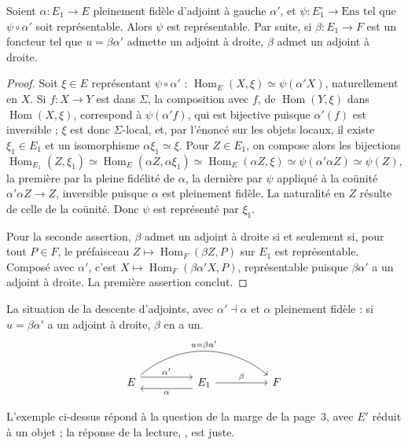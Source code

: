 \begin{enonce}
Soient $\alpha : E_1 \to E$ pleinement fidèle d'adjoint à gauche $\alpha'$, et $\psi : E_1^{\circ} \to \mathrm{Ens}$ tel que $\psi \circ \alpha'$ soit représentable. Alors $\psi$ est représentable. Par suite, si $\beta : E_1 \to F$ est un foncteur tel que $u = \beta\alpha'$ admette un adjoint à droite, $\beta$ admet un adjoint à droite.
\end{enonce}

\begin{proof}
Soit $\xi \in E$ représentant $\psi \circ \alpha'$ : $\operatorname{Hom}_E(X, \xi) \simeq \psi(\alpha' X)$, naturellement en $X$. Si $f : X \to Y$ est dans $\Sigma$, la composition avec $f$, de $\operatorname{Hom}(Y, \xi)$ dans $\operatorname{Hom}(X, \xi)$, correspond à $\psi(\alpha' f)$, qui est bijective puisque $\alpha'(f)$ est inversible ; $\xi$ est donc $\Sigma$-local, et, par l'énoncé sur les objets locaux, il existe $\xi_1 \in E_1$ et un isomorphisme $\alpha \xi_1 \simeq \xi$. Pour $Z \in E_1$, on compose alors les bijections
\[
  \operatorname{Hom}_{E_1}(Z, \xi_1) \simeq \operatorname{Hom}_E(\alpha Z, \alpha \xi_1) \simeq \operatorname{Hom}_E(\alpha Z, \xi) \simeq \psi(\alpha'\alpha Z) \simeq \psi(Z),
\]
la première par la pleine fidélité de $\alpha$, la dernière par $\psi$ appliqué à la coünité $\alpha'\alpha Z \to Z$, inversible puisque $\alpha$ est pleinement fidèle. La naturalité en $Z$ résulte de celle de la coünité. Donc $\psi$ est représenté par $\xi_1$.

Pour la seconde assertion, $\beta$ admet un adjoint à droite si et seulement si, pour tout $P \in F$, le préfaisceau $Z \mapsto \operatorname{Hom}_F(\beta Z, P)$ sur $E_1$ est représentable. Composé avec $\alpha'$, c'est $X \mapsto \operatorname{Hom}_F(\beta\alpha' X, P)$, représentable puisque $\beta\alpha'$ a un adjoint à droite. La première assertion conclut.
\end{proof}

La situation de la descente d'adjoints, avec $\alpha' \dashv \alpha$ et $\alpha$ pleinement fidèle : si $u = \beta\alpha'$ a un adjoint à droite, $\beta$ en a un.
\[
\begin{tikzcd}[column sep=huge]
E \arrow[r, shift left=1.2ex, "\alpha'"] \arrow[rr, bend left=40, "u = \beta\alpha'"] & E_1 \arrow[l, shift left=1.2ex, "\alpha"] \arrow[r, "\beta"] & F
\end{tikzcd}
\]

\begin{remarque}
L'exemple ci-dessus répond à la question de la marge de la page~3, avec $E'$ réduit à un objet ; la réponse de la lecture, , est juste.
\end{remarque}

